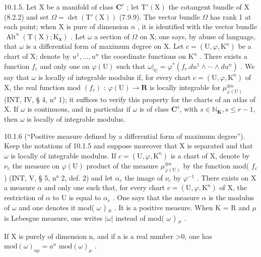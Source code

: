 10.1.5. Let X be a manifold of class \(\mathbf{C}^r\) ; let \(\mathrm{T}'(\mathrm{X})\) the cotangent bundle of X (8.2.2) and set \(\Omega = \det(\mathrm{T}'(\mathrm{X}))\) (7.9.9). The vector bundle \(\Omega\) has rank 1 at each point; when X is pure of dimension \(n\) , it is identified with the vector bundle \(\operatorname{Alt}^n(\mathrm{T}(\mathrm{X}); \mathrm{K}_{\mathbf{x}})\) . Let \(\omega\) a section of \(\Omega\) on X; one says, by abuse of language, that \(\omega\) is a differential form of maximum degree on X. Let \(c = (\mathrm{U}, \varphi, \mathrm{K}^n)\) be a chart of X; denote by \(u^1, \ldots, u^n\) the coordinate functions on \(\mathrm{K}^n\) . There exists a function \(f_c\) and only one on \(\varphi(\mathrm{U})\) such that \(\omega|_{\mathrm{U}} = \varphi^*(f_c.du^1 \wedge \cdots \wedge du^n)\) . We say that \(\omega\) is locally of integrable modulus if, for every chart \(c = (\mathrm{U}, \varphi, \mathrm{K}^n)\) of X, the real function mod \((f_c)\) : \(\varphi(\mathrm{U}) \to \mathbf{R}\) is locally integrable for \(\mu_{\varphi(\mathrm{U})}^{\otimes n}\) (INT, IV, § 4, n° 1); it suffices to verify this property for the charts of an atlas of X. If \(\omega\) is continuous, and in particular if \(\omega\) is of class \(\mathbf{C}^s\), with \(s \in \mathbb{N}_{\mathbf{K}}, s \leqslant r - 1\), then \(\omega\) is locally of integrable modulus.

10.1.6 (“Positive measure defined by a differential form of maximum degree”). Keep the notations of 10.1.5 and suppose moreover that X is separated and that \(\omega\) is locally of integrable modulus. If \(c = (\mathrm{U}, \varphi, \mathrm{K}^n)\) is a chart of X, denote by \(\nu_c\) the measure on \(\varphi(\mathrm{U})\) product of the measure \(\mu_{\varphi(\mathrm{U})}^{\otimes n}\) by the function mod( \(f_c\) ) (INT, V, § 5, n° 2, def. 2) and let \(\alpha_c\) the image of \(\nu_c\) by \(\varphi^{-1}\) . There exists on X a measure \(\alpha\) and only one such that, for every chart \(c = (\mathrm{U}, \varphi, \mathrm{K}^n)\) of X, the restriction of \(\alpha\) to U is equal to \(\alpha_c\) . One says that the measure \(\alpha\) is the modulus of \(\omega\) and one denotes it mod( \(\omega\) ) \(_\mu\) . It is a positive measure. When K = R and \(\mu\) is Lebesgue measure, one writes \(|\omega|\) instead of mod( \(\omega\) ) \(_\mu\) .

If X is purely of dimension n, and if a is a real number \textgreater0, one has \(\text{mod}(\omega)_{a\mu} = a^{n} \text{ mod}(\omega)_{\mu}\) .

